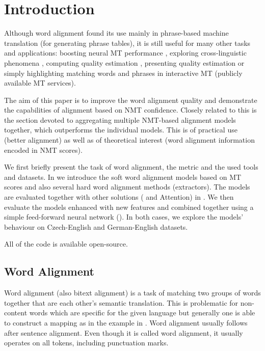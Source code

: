 \section{Introduction}

Although word alignment found its use mainly in phrase-based machine translation (for generating phrase tables), it is still useful for many other tasks and applications: boosting neural MT performance \citep{alkhouli2016alignment}, exploring cross-linguistic phenomena \citep{schrader2006does}, computing quality estimation \citep{specia2013quest}, presenting quality estimation \citep{zouhar2020extending} or simply highlighting matching words and phrases in interactive MT (publicly available MT services).

The aim of this paper is to improve the word alignment quality and demonstrate the capabilities of alignment based on NMT confidence. Closely related to this is the section devoted to aggregating multiple NMT-based alignment models together, which outperforms the individual models.
This is of practical use (better alignment) as well as of theoretical interest (word alignment information encoded in NMT scores). 

We first briefly present the task of word alignment, the metric and the used tools and datasets.
In  we introduce the soft word alignment models based on MT scores and also several hard word alignment methods (extractors).
The models are evaluated together with other solutions (\fastalign{} and Attention) in .
We then evaluate the models enhanced with new features and combined together using a simple feed-forward neural network ().
In both cases, we explore the models' behaviour on Czech-English and German-English datasets.

All of the code is available open-source.

\subsection{Word Alignment} \label{subsec:word_alignment}

Word alignment (also bitext alignment) is a task of matching two groups of words together that are each other's semantic translation. This is problematic for non-content words which are specific for the given language but generally one is able to construct a mapping as in the example in . Word alignment usually follows after sentence alignment.
Even though it is called word alignment, it usually operates on all tokens, including punctuation marks.

